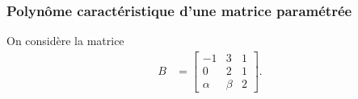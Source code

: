 \subsubsection{Polynôme caractéristique d'une matrice paramétrée}

On considère la matrice
\begin{align*}
  B & = \left[\begin{array}{rrr}
    -1 & 3 & 1 \\ 0 & 2 & 1 \\ \alpha & \beta & 2
    \end{array}\right].  
\end{align*}

